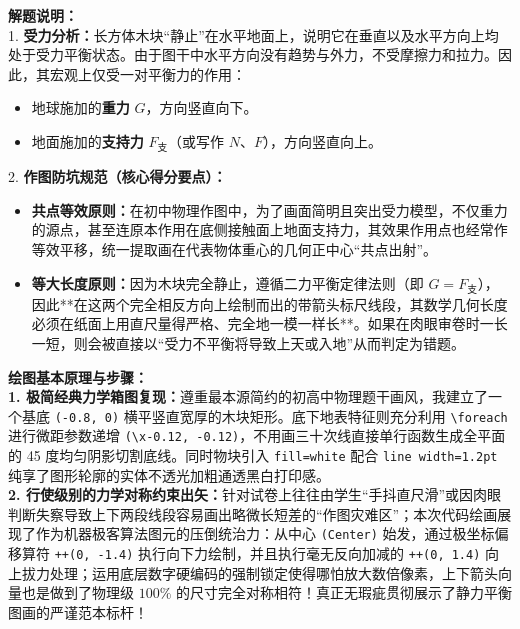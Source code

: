 \vspace{0.6cm}

{\small\color{gray}
\textbf{解题说明：}\\
1. \textbf{受力分析：}长方体木块“静止”在水平地面上，说明它在垂直以及水平方向上均处于受力平衡状态。由于图干中水平方向没有趋势与外力，不受摩擦力和拉力。因此，其宏观上仅受一对平衡力的作用：
\begin{itemize}
    \item 地球施加的\textbf{重力} $G$，方向竖直向下。
    \item 地面施加的\textbf{支持力} $F_{\text{支}}$（或写作 $N$、$F$），方向竖直向上。
\end{itemize}
2. \textbf{作图防坑规范（核心得分要点）：}
\begin{itemize}
    \item \textbf{共点等效原则：}在初中物理作图中，为了画面简明且突出受力模型，不仅重力的源点，甚至连原本作用在底侧接触面上地面支持力，其效果作用点也经常作等效平移，统一提取画在代表物体重心的几何正中心“共点出射”。
    \item \textbf{等大长度原则：}因为木块完全静止，遵循二力平衡定律法则（即 $G = F_{\text{支}}$），因此**在这两个完全相反方向上绘制而出的带箭头标尺线段，其数学几何长度必须在纸面上用直尺量得严格、完全地一模一样长**。如果在肉眼审卷时一长一短，则会被直接以“受力不平衡将导致上天或入地”从而判定为错题。
\end{itemize}
}

\vspace{0.6cm}

{\small\color{blue!70!black}
\textbf{绘图基本原理与步骤：}\\
\textbf{1. 极简经典力学箱图复现：}遵重最本源简约的初高中物理题干画风，我建立了一个基底 \texttt{(-0.8, 0)} 横平竖直宽厚的木块矩形。底下地表特征则充分利用 \texttt{\textbackslash foreach} 进行微距参数递增 \texttt{(\textbackslash x-0.12, -0.12)}，不用画三十次线直接单行函数生成全平面的 45 度均匀阴影切割底线。同时物块引入 \texttt{fill=white} 配合 \texttt{line width=1.2pt} 纯享了图形轮廓的实体不透光加粗通透黑白打印感。\\
\textbf{2. 行使级别的力学对称约束出矢：}针对试卷上往往由学生“手抖直尺滑”或因肉眼判断失察导致上下两段线段容易画出略微长短差的“作图灾难区”；本次代码绘画展现了作为机器极客算法图元的压倒统治力：从中心 \texttt{(Center)} 始发，通过极坐标偏移算符 \texttt{++(0, -1.4)} 执行向下力绘制，并且执行毫无反向加减的 \texttt{++(0, 1.4)} 向上拔力处理；运用底层数字硬编码的强制锁定使得哪怕放大数倍像素，上下箭头向量也是做到了物理级 $100\%$ 的尺寸完全对称相符！真正无瑕疵贯彻展示了静力平衡图画的严谨范本标杆！
}

